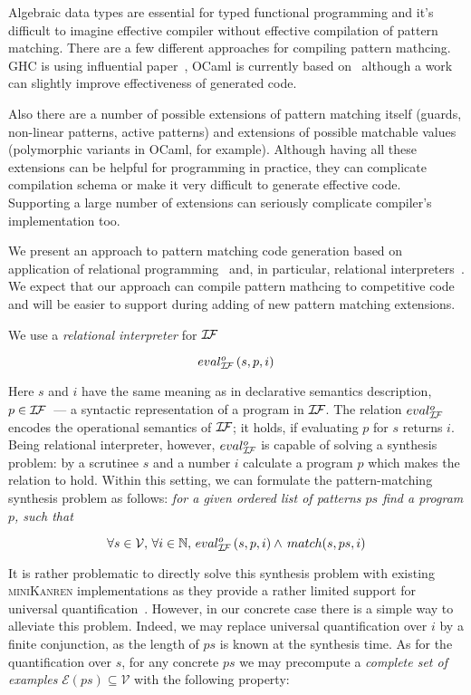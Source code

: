 Algebraic data types are essential for typed functional programming and it's difficult to imagine effective compiler without effective compilation of pattern matching. 
There are a few different approaches for compiling pattern mathcing. GHC is using influential paper~\cite{Jones1987}, OCaml is currently based on~\cite{maranget2001} although a work~\cite{maranget2008} can slightly improve effectiveness of generated code. 

Also there are a number of possible extensions of pattern matching itself (guards, non-linear patterns, active patterns) and extensions of possible matchable values (polymorphic variants in OCaml, for example). Although having all these extensions can be helpful for programming in practice, they can complicate compilation schema or make it very difficult to generate effective code. Supporting a large number  of extensions can seriously complicate compiler's implementation too.

We present an approach to pattern matching code generation based on application of relational programming~\cite{TRS,WillThesis} and, in
 particular, relational interpreters~\cite{unified}. We expect that our approach can compile pattern mathcing to competitive code and will be easier to support during adding of new pattern matching extensions.
 
 We use a \emph{relational interpreter} for $\mathcal{I\!F}$
 
 \[
 eval^o_{\mathcal{I\!F}}\, (s, p, i)
 \]
 
 Here $s$ and $i$ have the same meaning as in declarative semantics description, $p\in\mathcal{I\!F}$~--- a syntactic representation of
 a program in $\mathcal{I\!F}$. The relation $eval^o_{\mathcal{I\!F}}$ encodes the operational semantics of $\mathcal{I\!F}$; it holds, if
 evaluating $p$ for $s$ returns $i$. Being relational interpreter, however, $eval^o_{\mathcal{I\!F}}$ is capable of solving a
 synthesis problem: by a scrutinee $s$ and a number $i$ calculate a program $p$ which makes the relation to hold.
 Within this setting, we can formulate the pattern-matching synthesis problem as follows: \emph{for a given ordered list of patterns $ps$ find a program $p$, such that}
 
 \[
 \forall s\in\mathcal{V},\,\forall i\in\mathbb{N},\,eval^o_{\mathcal{I\!F}}\, (s, p, i) \wedge\, match (s, ps, i)
 \]
 
 It is rather problematic to directly solve this synthesis problem with existing \textsc{miniKanren} implementations as
 they provide a rather limited support for universal quantification~\cite{eigen,moiseenko}. However, in our concrete
 case there is a simple way to alleviate this problem. Indeed, we may replace universal quantification over $i$ by
 a finite conjunction, as the length of $ps$ is known at the synthesis time. As for the quantification over $s$, for
 any concrete $ps$ we may precompute a \emph{complete set of examples} $\mathcal{E}(ps)\subseteq\mathcal{V}$ with the following
 property:
 
